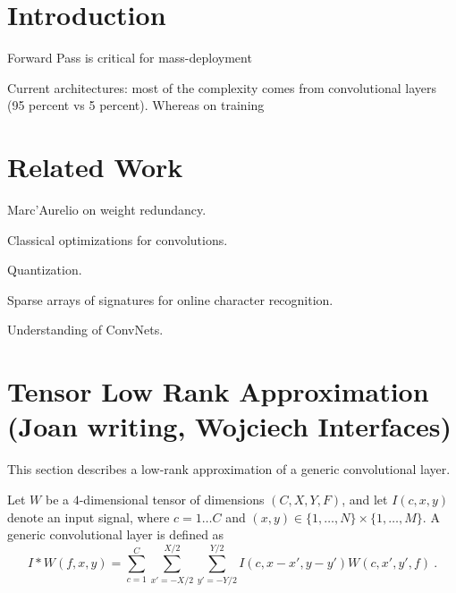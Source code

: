 \documentclass{article}
\begin{document}
 





\begin{abstract}

\end{abstract}

\section{Introduction}

Forward Pass is critical for mass-deployment

Current architectures: most of the complexity comes from 
convolutional layers (95 percent vs 5 percent). Whereas on training




\section{Related Work}

Marc'Aurelio on weight redundancy.

Classical optimizations for convolutions. 

Quantization.

Sparse arrays of signatures for online character
recognition.

Understanding of ConvNets. 


\section{Tensor Low Rank Approximation (Joan writing, Wojciech Interfaces)}

This section describes a low-rank approximation of a generic 
convolutional layer. 

Let $W$ be a $4$-dimensional tensor of dimensions $(C,X,Y,F)$,
and let $I(c,x,y)$ denote an input signal, 
where $c=1\dots C$ and $(x,y) \in \{1,\dots,N\}\times \{1,\dots,M\}$.
A generic convolutional layer is defined as
\begin{equation}
\label{convlayereq}
I \ast W (f,x,y) = \sum_{c=1}^C \sum_{x'=-X/2}^{X/2} \sum_{y'=-Y/2}^{Y/2} I(c,x-x',y-y') W(c,x',y',f)~.
\end{equation}
\end{document}
